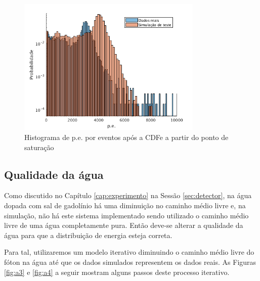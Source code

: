 \begin{figure}[H]
	\centering
	\includegraphics[width=8.8cm]{textuais/simulacao/figuras/hist_evt6.png}
	\caption{Histograma de p.e. por eventos após a CDFe a partir do ponto de saturação}
	\label{fig:cdfe}
\end{figure}

\subsection{Qualidade da água}

Como discutido no Capítulo \ref{cap:experimento} na Sessão \ref{sec:detector}, na água dopada com sal de gadolínio há uma diminuição no caminho médio livre e, na simulação, não há este sistema implementado sendo utilizado o caminho médio livre de uma água completamente pura. Então deve-se alterar a qualidade da água para que a distribuição de energia esteja correta.

Para tal, utilizaremos um modelo iterativo diminuindo o caminho médio livre do fóton na água até que os dados simulados representem os dados reais. As Figuras \ref{fig:a3} e \ref{fig:a4} a seguir mostram alguns passos deste processo iterativo.



